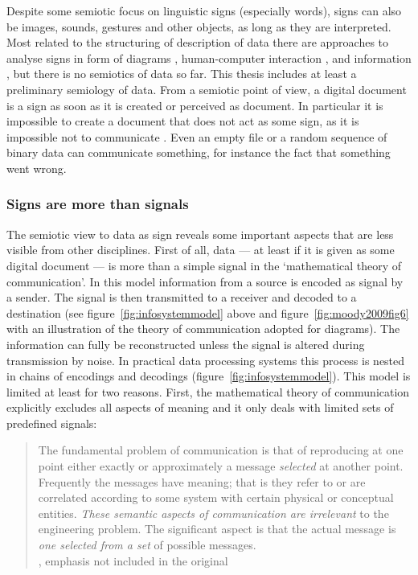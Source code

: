 
Despite some semiotic focus on linguistic signs (especially words), signs can
also be images, sounds, gestures and other objects, as long as they are
interpreted. Most related to the structuring of description of data there are
approaches to analyse signs in form of diagrams \cite{Bertin2011},
human-computer interaction \cite{Souza2012}, and information
\cite{Brier2008,Huang2006,Raber2003}, but there is no semiotics of data so far.
This thesis includes at least a preliminary semiology of data.  From a semiotic
point of view, a digital document is a sign as soon as it is created or
perceived as document.  In particular it is impossible to create a document
that does not act as some sign, as it is impossible not to communicate
\cite{Watzlawick1967}.  Even an empty file or a random sequence of binary data
can communicate something, for instance the fact that something went wrong.

\subsubsection{Signs are more than signals}

The semiotic view to data as sign reveals some important aspects that are less
visible from other disciplines. First of all, data --- at least if it is given
as some digital document --- is more than a simple signal in the `mathematical
theory of communication'. In this model \cite{Shannon1948} information from a
source is encoded as signal by a sender. The signal is then transmitted to a
receiver and decoded to a destination (see figure~\ref{fig:infosystemmodel}
above and figure~\ref{fig:moody2009fig6} with an illustration of the theory of
communication adopted for diagrams). The information can fully be reconstructed
unless the signal is altered during transmission by noise. In practical data
processing systems this process is nested in chains of encodings and decodings
(figure~\ref{fig:infosystemmodel}).  This model is limited at least for two
reasons. First, the mathematical theory of communication explicitly excludes
all aspects of meaning and it only deals with limited sets of predefined
signals:

\begin{quotation}%
The fundamental problem of
communication is that of reproducing at one point either exactly or
approximately a message \emph{selected} at another point.  Frequently the
messages have meaning; that is they refer to or are correlated according to
some system with certain physical or conceptual entities.  \emph{These semantic
aspects of communication are irrelevant} to the engineering problem. The
significant aspect is that the actual message is \emph{one selected from a set}
of possible messages.\\
\quotationsource \textcite{Shannon1948}, emphasis not included in the original
\end{quotation}


